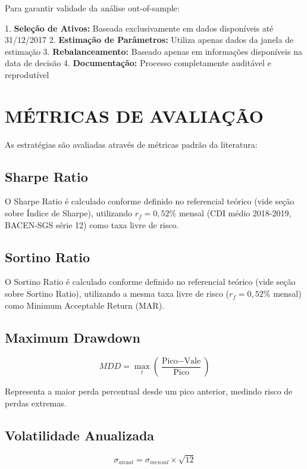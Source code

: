 Para garantir validade da análise out-of-sample:

1. \textbf{Seleção de Ativos:} Baseada exclusivamente em dados disponíveis até 31/12/2017
2. \textbf{Estimação de Parâmetros:} Utiliza apenas dados da janela de estimação
3. \textbf{Rebalanceamento:} Baseado apenas em informações disponíveis na data de decisão
4. \textbf{Documentação:} Processo completamente auditável e reprodutível

\section{MÉTRICAS DE AVALIAÇÃO}

As estratégias são avaliadas através de métricas padrão da literatura:

\subsection{Sharpe Ratio}

O Sharpe Ratio é calculado conforme definido no referencial teórico (vide seção sobre Índice de Sharpe), utilizando $r_f = 0,52\%$ mensal (CDI médio 2018-2019, BACEN-SGS série 12) como taxa livre de risco.

\subsection{Sortino Ratio}

O Sortino Ratio é calculado conforme definido no referencial teórico (vide seção sobre Sortino Ratio), utilizando a mesma taxa livre de risco ($r_f = 0,52\%$ mensal) como Minimum Acceptable Return (MAR).

\subsection{Maximum Drawdown}

\begin{equation}
MDD = \max_{t} \left( \frac{\text{Pico} - \text{Vale}}{\text{Pico}} \right)
\end{equation}

Representa a maior perda percentual desde um pico anterior, medindo risco de perdas extremas.

\subsection{Volatilidade Anualizada}

\begin{equation}
\sigma_{anual} = \sigma_{mensal} \times \sqrt{12}
\end{equation}

